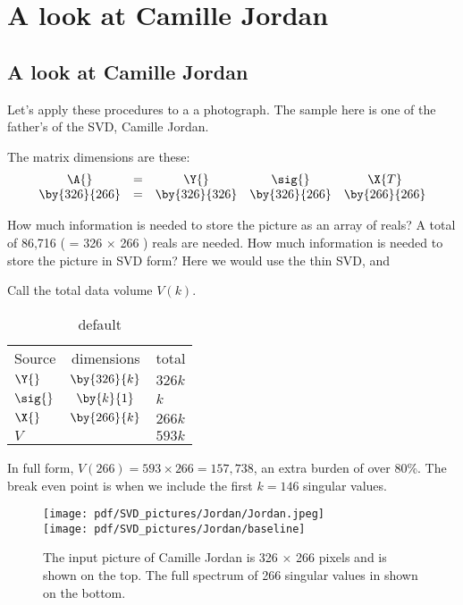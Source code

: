 \clearpage
\break

\section{A look at Camille Jordan}

\subsection{A look at Camille Jordan}
Let's apply these procedures to a a photograph. The sample here is one of the father's of the SVD, Camille Jordan.

The matrix dimensions are these:
\begin{equation}
  \begin{array}{ccccc}
    \A{}          & = & \Y{} & \sig{} & \X{T} \\
    \by{326}{266} & = & \by{326}{326} & \by{326}{266} & \by{266}{266}
  \end{array}
\end{equation}

How much information is needed to store the picture as an array of reals? A total of 86,716 ( = 326 $\times$ 266 ) reals are needed.
How much information is needed to store the picture in SVD form? Here we would use the thin SVD, and

Call the total data volume $V(k)$.
\begin{table}[htdp]
\caption{default}
\begin{center}
\begin{tabular}{lcl}
Source & dimensions & total \\
$\Y{}$ & $\by{326}{k}$ & $326k$\\
$\sig{}$ & $\by{k}{1}$ & $k$\\
$\X{}$ & $\by{266}{k}$ & $266k$\\\hline
$V$ && $593k$
\end{tabular}
\end{center}
\label{default}
\end{table}%

In full form, $V(266) = 593\times266 = 157,738$, an extra burden of over 80\%. The break even point is when we include the first $k=146$ singular values.

\begin{figure}[htbp] %
   \centering
   \texttt{[image: pdf/SVD\_pictures/Jordan/Jordan.jpeg]} \\[20pt]
   \texttt{[image: pdf/SVD\_pictures/Jordan/baseline]} 
   \caption{The input picture of Camille Jordan is 326 $\times$ 266 pixels and is shown on the top. The full spectrum of 266 singular values in shown on the bottom.}
   \label{fig:Jordan:baseline}
\end{figure}

